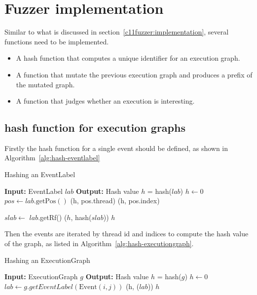\section{Fuzzer implementation}

Similar to what is discussed in section~\ref{c11fuzzer:implementation}, several functions need to be implemented.

\begin{itemize}
	\item A hash function that computes a unique identifier for an execution graph.
	\item A function that mutate the previous execution graph and produces a prefix of the mutated graph.
	\item A function that judges whether an execution is interesting.
\end{itemize}


\subsection{hash function for execution graphs}\label{sec:hashf}
Firstly the hash function for a single event should be defined, as shown in Algorithm~\ref{alg:hash-eventlabel}

\begin{algorithm}
	\caption{Hashing an EventLabel}
	\label{alg:hash-eventlabel}
	\begin{algorithmic}[1]
		\STATE \textbf{Input:} EventLabel $lab$
		\STATE \textbf{Output:} Hash value $h$ = hash($lab$)
		\STATE $h \leftarrow 0$
		\STATE $pos \leftarrow lab.\text{getPos}()$
		\STATE {}(h, pos.thread)
		\STATE {}(h, pos.index)

		\STATE $slab \leftarrow$ $lab$.getRf()
		\STATE {}($h$, hash($slab$))
		\ENDIF
		\ENDIF
		\RETURN $h$
	\end{algorithmic}
\end{algorithm}

Then the events are iterated by thread id and indices to compute the hash value of the graph, as listed in Algorithm~\ref{alg:hash-executiongraph}.


\begin{algorithm}
	\caption{Hashing an ExecutionGraph}
	\label{alg:hash-executiongraph}
	\begin{algorithmic}[1]
		\STATE \textbf{Input:} ExecutionGraph $g$
		\STATE \textbf{Output:} Hash value $h$ = hash($g$)
		\STATE $h \leftarrow 0$
		\STATE $lab \leftarrow g.getEventLabel(\text{Event}(i, j))$
		\STATE {}(h, ($lab$))
		\ENDFOR
		\ENDFOR
		\RETURN $h$
	\end{algorithmic}
\end{algorithm}

